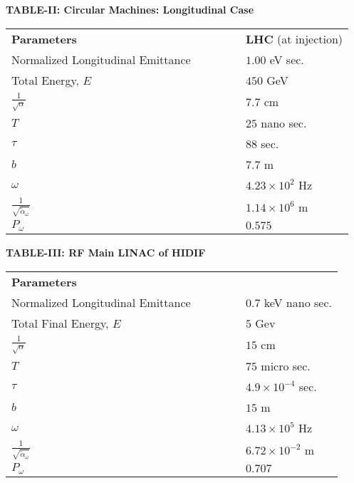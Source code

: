 \documentclass[]{article}
\begin{document}
\begin{center}

{\bf TABLE-II: Circular Machines: Longitudinal Case}
\medskip

\begin{tabular}{ll}
{\bf Parameters} & {\bf LHC} (at injection) \\
Normalized Longitudinal Emittance ~~~~~~~ & $1.00$ eV sec. \\ 
Total Energy, $E$ & $450$ GeV \\
$\frac{1}{\sqrt{\alpha}}$ & $7.7$ cm \\
$T$ & $25$ nano sec. \\
$\tau$ & $88$ sec. \\
$b$ & $7.7$ m \\
$\omega$ & $4.23 \times 10^{2}$ Hz \\
$\frac{1}{\sqrt{{\tilde{\alpha}_\omega}}}$ & $1.14 \times 10^{6}$ m \\
$P_{\omega}$ & $0.575$ \\
\end{tabular}

\end{center}

\bigskip

\begin{center}

{\bf TABLE-III: RF Main LINAC of HIDIF}
\medskip
\begin{tabular}{ll}
{\bf Parameters} & \\
Normalized Longitudinal Emittance ~~~~~~~ & $0.7$ keV nano sec. \\
Total Final Energy, $E$ & $5$ Gev \\
$\frac{1}{\sqrt{\alpha}}$ & $15$ cm \\
$T$ & $75$ micro sec. \\
$\tau$ & $4.9 \times 10^{-4}$ sec. \\
$b$ & $15$ m \\
$\omega$ & $4.13 \times 10^{5}$ Hz \\
$\frac{1}{\sqrt{{\tilde{\alpha}_\omega}}}$ & $6.72 \times 10^{-2}$ m \\
$P_{\omega}$ & $0.707$ \\
\end{tabular}

\end{center}
\end{document}
